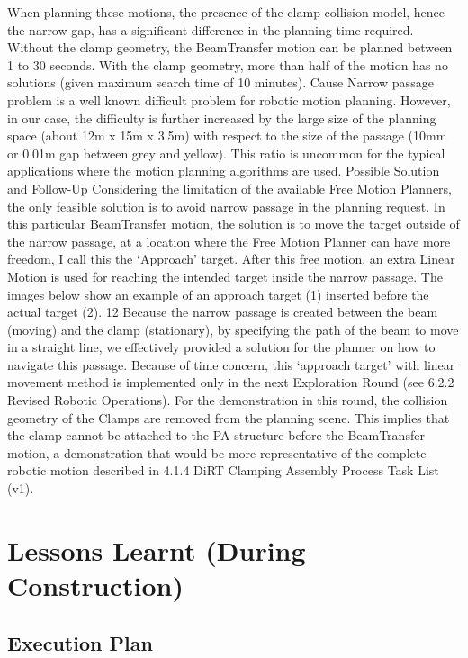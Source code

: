 When planning these motions, the presence of the clamp collision model, hence the narrow gap, has a significant difference in the planning time required. Without the clamp geometry, the BeamTransfer motion can be planned between 1 to 30 seconds. With the clamp geometry, more than half of the motion has no solutions (given maximum search time of 10 minutes).
Cause
Narrow passage problem is a well known difficult problem for robotic motion planning. However, in our case, the difficulty is further increased by the large size of the planning space (about 12m x 15m x 3.5m) with respect to the size of the passage (10mm or 0.01m gap between grey and yellow). This ratio is uncommon for the typical applications where the motion planning algorithms are used.
Possible Solution and Follow-Up
Considering the limitation of the available Free Motion Planners, the only feasible solution is to avoid narrow passage in the planning request. In this particular BeamTransfer motion, the solution is to move the target outside of the narrow passage, at a location where the Free Motion Planner can have more freedom, I call this the ‘Approach’ target. After this free motion, an extra Linear Motion is used for reaching the intended target inside the narrow passage. The images below show an example of an approach target (1) inserted before the actual target (2).
12
Because the narrow passage is created between the beam (moving) and the clamp (stationary), by specifying the path of the beam to move in a straight line, we effectively provided a solution for the planner on how to navigate this passage. 
Because of time concern, this ‘approach target’ with linear movement method is implemented only in the next Exploration Round (see 6.2.2 Revised Robotic Operations). For the demonstration in this round, the collision geometry of the Clamps are removed from the planning scene. This implies that the clamp cannot be attached to the PA structure before the BeamTransfer motion, a demonstration that would be more representative of the complete robotic motion described in 4.1.4 DiRT Clamping Assembly Process Task List (v1).

\section{Lessons Learnt (During Construction)}
\label{section:exploration_2_lessons_learnt_during_construction}

\subsection{Execution Plan}
\label{subsection:exploration_2_execution_plan}

